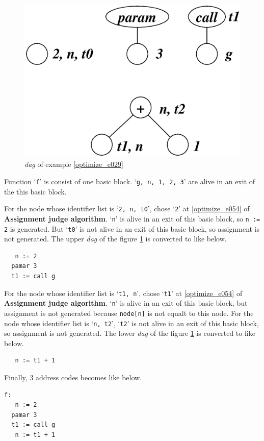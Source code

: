 \begin{Example}
\begin{figure}[htbp]
\begin{center}
\begin{latexonly}
\includegraphics[width=0.8\linewidth,height=0.571\linewidth]{opt013.eps}
\end{latexonly}
\caption{{\em dag} of example \ref{optimize_e029}}
\label{optimize_e030}
\end{center}
\end{figure}
Function `{\tt{f}}' is consist of one basic block.
`{\tt{g, n, 1, 2, 3}}' are alive in an exit of the this basic block.

For the node whose identifier list is `{\tt{2, n, t0}}',
chose `{\tt{2}}' at \ref{optimize_e054} of {\bf Assignment judge
 algorithm}.
`{\tt{n}}' is alive in an exit of this basic block, so
{\tt{n := 2}} is generated. But
`{\tt{t0}}' is not alive in an exit of this basic block, so
assignment is not generated.
The upper {\em dag} of the figure \ref{optimize_e030} 
is converted to like below.
\begin{verbatim}
   n := 2
  pamar 3
  t1 := call g
\end{verbatim}
For the node whose identifier list is `{\tt{t1, n}}',
chose `{\tt{t1}}' at \ref{optimize_e054} of {\bf Assignment judge
 algorithm}.
`{\tt{n}}' is alive in an exit of this basic block, but
assignment is not generated because {\tt{node[n]}} is
not equalt to this node.
For the node whose identifier list is `{\tt{n, t2}}',
`{\tt{t2}}' is not alive in an exit of this basic block, 
so assignment is not generated.
The lower {\em dag} of the figure \ref{optimize_e030} 
is converted to like below.
\begin{verbatim}
   n := t1 + 1
\end{verbatim}
Finally, 3 address codes becomes like below.
\begin{verbatim}
f:
   n := 2
  pamar 3
  t1 := call g
   n := t1 + 1
\end{verbatim}
\end{Example}

